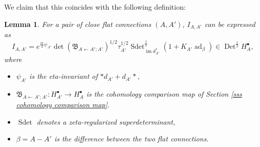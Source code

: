 \documentclass[11pt,a4paper]{amsart}
\theoremstyle{plain} %
\newtheorem{lem}[thm]{Lemma}
\theoremstyle{definition}
\newtheorem{defn}[thm]{Definition}
\theoremstyle{remark}
\newcommand{\Det}{\operatorname{Det}}
\newcommand{\im}{\operatorname{im}}
\newcommand{\sdet}{\operatorname{Sdet}}
\newcommand{\mr}{\mathrm}
\newcommand{\bt}{\bullet}
\newcommand{\ra}{\rightarrow}
\newcommand{\la}{\leftarrow}
\newcommand{\BB}{\mathfrak{B}}
\begin{document}
{\begin{equation}
    \end{equation}
    We claim that this coincides with the following definition: 
    \begin{lem} For a pair of close flat connections $(A,A')$, $I_{A,A'}$ can be expressed as 
\begin{equation}\label{I def}
    I_{A,A'} = e^{\frac{i\pi}{4} \psi_{A'}}%
    \det(\BB_{A\la A';A'})^{1/2}
    \tau_{A'}^{1/2}\sdet^{\frac{1}{2}}_{\im d_{A'}^*}\left(1 + K_{A'}\operatorname{ad}_\beta\right) \in \Det^{\frac12} H^\bullet_{A},
\end{equation}
where 
\begin{itemize}
    \item $\psi_{A'}$ is the eta-invariant of $*d_{A'} + d_{A'}*$, 
    \item $\BB_{A\la A';A'}\colon H^\bt_{A'}\ra H^\bt_{A}$ is the cohomology comparison map of Section \ref{sss cohomology comparison map}.
    \item $\sdet$ denotes a zeta-regularized superdeterminant, %
    \item $\beta = A - A'$ is the difference between the two flat connections. 
\end{itemize}
\end{lem} 
}
\end{document}
